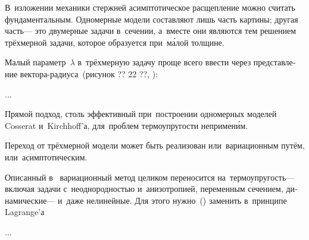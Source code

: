 \begin{otherlanguage}{russian}

В~изложении механики стержней асимптотическое расщепление можно считать фундаментальным.
Одномерные модели составляют лишь часть картины; другая часть\:--- это двумерные задачи в~сечении, а~вместе они являются тем решением трёхмерной задачи, которое образуется при~м\'{а}лой толщине.

Малый параметр~$\lambda$ в~трёхмерную задачу проще всего ввести через представление вектора\hbox{-}радиуса~(рисунок ?? 22 ??, ):

...



\end{otherlanguage}



\begin{otherlanguage}{russian}

Прямой подход, столь эффективный при~построении одномерных моделей Cosserat и~Kirchhoff’а, для~проблем термоупругости непримен\'{и}м.

Переход от трёхмерной модели может быть реализован или~вариационным путём, или~асимптотическим.

Описанный в~ вариационный метод целиком переносится на~термоупругость\:--- включая задачи с~неоднородностью и~анизотропией, переменным сечением, динамические\:--- и~даже нелинейные.
Для этого нужно~() заменить в~принципе Lagrange’а

...




\end{otherlanguage}

\section*{\small \wordforbibliography}

